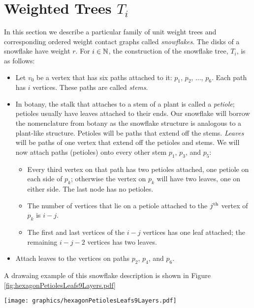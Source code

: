 \section{Weighted Trees $T_i$}
In this section we describe a particular family of unit weight trees and corresponding ordered weight contact graphs called \textit{snowflakes}.  
The disks of a snowflake have weight $r$.  
For $i \in {\mathbb{N}}$, the construction of the snowflake tree, $T_i$, is as follows:
\begin{itemize}
\item Let $v_0$ be a vertex that has six paths attached to it: $p_1$, $p_2$, $\dots$, $p_6$.  
Each path has $i$ vertices. 
These paths are called \textit{stems}.
\item In botany, the stalk that attaches to a stem of a plant is called a \textit{petiole}; petioles usually have leaves attached to their ends.  
Our snowflake will borrow the nomenclature from botany as the snowflake structure is analogous to a plant-like structure.  
Petioles will be paths that extend off the stems.  
\textit{Leaves} will be paths of one vertex that extend off the petioles and stems.  
We will now attach paths (petioles) onto every other stem $p_1$, $p_3$, and $p_5$: 
	\begin{itemize}
		\item 	Every third vertex on that path has two petioles attached, one petiole on each side of $p_k$; otherwise the vertex on $p_k$ will have two leaves, one on either side.  The last node has no petioles.
		\item	The number of vertices that lie on a petiole attached to the $j^\text{th}$ vertex of  $p_k$ is $i-j$.
		\item The first and last vertices of the $i-j$ vertices has one leaf attached; the remaining $i-j-2$ vertices has two leaves. %
	\end{itemize}
\item Attach leaves to the vertices on paths $p_2$, $p_4$, and $p_6$.
\end{itemize}
A drawaing example of this snowflake description is shown in Figure \ref{fig:hexagonPetiolesLeafs9Layers.pdf}

\begin{minipage}{\linewidth}
\begin{center}
\texttt{[image: graphics/hexagonPetiolesLeafs9Layers.pdf]}
\label{fig:hexagonPetiolesLeafs9Layers.pdf}
\end{center}
\end{minipage}


